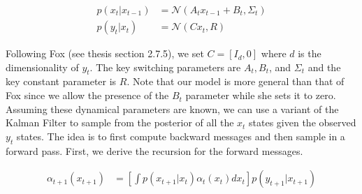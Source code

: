 \documentclass{article} %
\begin{document}
\begin{align*}
p(x_t|x_{t-1}) &= \mathcal{N}(A_t x_{t-1}+B_t,\Sigma_t)\\
p(y_t|x_t) &= \mathcal{N}(C x_t,R)
\end{align*}

Following Fox (see thesis section 2.7.5), we set $C = [I_d,0]$ where $d$ is the dimensionality of $y_t$. The key switching parameters are $A_t, B_t$, and $\Sigma_t$ and the key constant parameter is $R$. Note that our model is more general than that of Fox since we allow the presence of the $B_t$ parameter while she sets it to zero. Assuming these dynamical parameters are known, we can use a variant of the Kalman Filter to sample from the posterior of all the $x_t$ states given the observed $y_t$ states. The idea is to first compute backward messages and then sample in a forward pass. First, we derive the recursion for the forward messages.

\begin{align*}
\alpha_{t+1}(x_{t+1}) &= \left[\int p(x_{t+1}|x_t)\alpha_t(x_t)dx_t\right] p(y_{t+1}|x_{t+1})
\end{align*}
\end{document}
